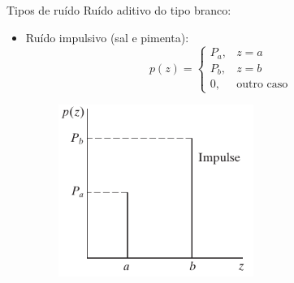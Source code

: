 \begin{slide}[toc=]{Tipos de ruído}
Ruído aditivo do tipo branco:
		{
		\begin{itemize}
			\item Ruído impulsivo (sal e pimenta):
				\begin{equation*}
					p(z)=\begin{cases}
						P_a, & z=a\\
						P_b, & z=b\\
						0, & \text{outro caso}
					\end{cases}
				\end{equation*}
				\begin{figure}[b!]
					\centering
					\includegraphics[width=0.6\textwidth]{figs/5-02f}
				\end{figure}
		\end{itemize}}
\end{slide}

